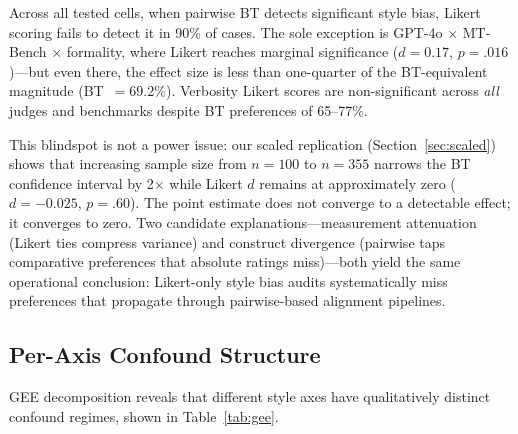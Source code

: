 \documentclass[11pt,a4paper]{article}
\begin{document}
Across all tested cells, when pairwise BT detects significant style bias, Likert scoring fails to detect it in 90\% of cases. The sole exception is GPT-4o $\times$ MT-Bench $\times$ formality, where Likert reaches marginal significance ($d = 0.17$, $p = .016$)---but even there, the effect size is less than one-quarter of the BT-equivalent magnitude (BT~$= 69.2\%$). Verbosity Likert scores are non-significant across \emph{all} judges and benchmarks despite BT preferences of 65--77\%.

This blindspot is not a power issue: our scaled replication (Section~\ref{sec:scaled}) shows that increasing sample size from $n = 100$ to $n = 355$ narrows the BT confidence interval by 2$\times$ while Likert $d$ remains at approximately zero ($d = -0.025$, $p = .60$). The point estimate does not converge to a detectable effect; it converges to zero. Two candidate explanations---measurement attenuation (Likert ties compress variance) and construct divergence (pairwise taps comparative preferences that absolute ratings miss)---both yield the same operational conclusion: Likert-only style bias audits systematically miss preferences that propagate through pairwise-based alignment pipelines.

\subsection{Per-Axis Confound Structure}
\label{sec:confound}

GEE decomposition reveals that different style axes have qualitatively distinct confound regimes, shown in Table~\ref{tab:gee}.
\end{document}
